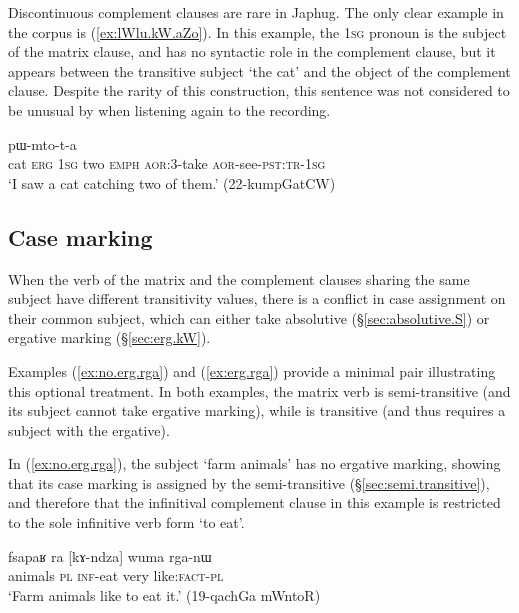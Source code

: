 Discontinuous complement clauses are rare in Japhug. The only clear example in the corpus is (\ref{ex:lWlu.kW.aZo}). In this example, the \textsc{1sg} pronoun  is the subject of the matrix clause, and has no syntactic role in the complement clause, but it appears between the transitive subject  `the cat' and the object  of the complement clause. Despite the rarity of this construction, this sentence was not considered to be unusual by  when listening again to the recording.
 
 \begin{exe}
\ex \label{ex:lWlu.kW.aZo}
 pɯ-mto-t-a \\
cat \textsc{erg} \textsc{1sg} two \textsc{emph} \textsc{aor}:3\flobv{}-take \textsc{aor}-see-\textsc{pst}:\textsc{tr}-\textsc{1sg} \\
\glt `I saw a cat catching two of them.' (22-kumpGatCW)
\end{exe}

\subsection{Case marking} \label{sec:complement.clause.case.marking}
When the verb of the matrix and the complement clauses sharing the same subject have different transitivity values, there is a conflict in case assignment on their common subject, which can either take absolutive (§\ref{sec:absolutive.S}) or ergative marking (§\ref{sec:erg.kW}). 


Examples (\ref{ex:no.erg.rga}) and  (\ref{ex:erg.rga})  provide a minimal pair illustrating this optional treatment. In both examples, the matrix verb  is semi-transitive (and its subject cannot take ergative marking), while  is transitive (and thus requires a subject with the ergative).


In (\ref{ex:no.erg.rga}), the subject  `farm animals' has no ergative marking, showing that its case marking is assigned by the semi-transitive  (§\ref{sec:semi.transitive}), and therefore that the infinitival complement clause in this example is restricted to the sole infinitive verb form  `to eat'.

\begin{exe}
\ex \label{ex:no.erg.rga}
\gll fsapaʁ ra [kɤ-ndza] wuma rga-nɯ  \\
animals \textsc{pl}  \textsc{inf}-eat very  like:\textsc{fact}-\textsc{pl} \\
\glt `Farm animals like to eat it.' (19-qachGa mWntoR)
\end{exe}

